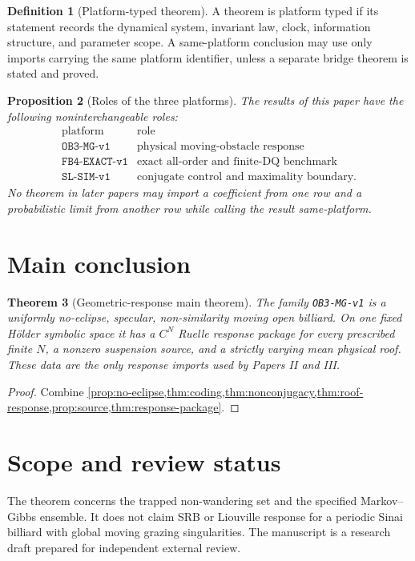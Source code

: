\documentclass[11pt,reqno]{amsart}
\newtheorem{theorem}{Theorem}[section]
\newtheorem{proposition}[theorem]{Proposition}
\theoremstyle{definition}
\newtheorem{definition}[theorem]{Definition}
\theoremstyle{remark}
\begin{document}
\begin{definition}[Platform-typed theorem]
A theorem is platform typed if its statement records the dynamical system,
invariant law, clock, information structure, and parameter scope.  A
same-platform conclusion may use only imports carrying the same platform
identifier, unless a separate bridge theorem is stated and proved.
\end{definition}

\begin{proposition}[Roles of the three platforms]\label{prop:roles}
The results of this paper have the following noninterchangeable roles:
\[
\begin{array}{c|c}
\text{platform}&\text{role}\\ \hline
\texttt{OB3-MG-v1}&\text{physical moving-obstacle response}\\
\texttt{FB4-EXACT-v1}&\text{exact all-order and finite-DQ benchmark}\\
\texttt{SL-SIM-v1}&\text{conjugate control and maximality boundary}.
\end{array}
\]
No theorem in later papers may import a coefficient from one row and a
probabilistic limit from another row while calling the result same-platform.
\end{proposition}

\section{Main conclusion}

\begin{theorem}[Geometric-response main theorem]\label{thm:main}
The family \texttt{OB3-MG-v1} is a uniformly no-eclipse, specular,
non-similarity moving open billiard.  On one fixed Hölder symbolic space it has
a $C^N$ Ruelle response package for every prescribed finite $N$, a nonzero
suspension source, and a strictly varying mean physical roof.  These data are
the only response imports used by Papers II and III.
\end{theorem}

\begin{proof}
Combine \cref{prop:no-eclipse,thm:coding,thm:nonconjugacy,thm:roof-response,prop:source,thm:response-package}.
\end{proof}

\section*{Scope and review status}

The theorem concerns the trapped non-wandering set and the specified
Markov--Gibbs ensemble.  It does not claim SRB or Liouville response for a
periodic Sinai billiard with global moving grazing singularities.  The
manuscript is a research draft prepared for independent external review.



\end{document}
